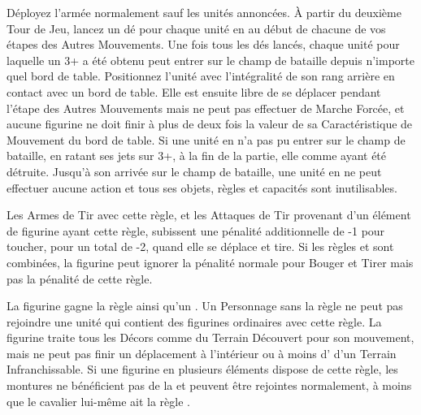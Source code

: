  Déployez l'armée normalement sauf les unités annoncées. À partir du deuxième Tour de Jeu, lancez un dé pour chaque unité en \ambush{} au début de chacune de vos étapes des Autres Mouvements. Une fois tous les dés lancés, chaque unité pour laquelle un 3+ a été obtenu peut entrer sur le champ de bataille depuis n'importe quel bord de table. Positionnez l'unité avec l'intégralité de son rang arrière en contact avec un bord de table. Elle est ensuite libre de se déplacer pendant l'étape des Autres Mouvements mais ne peut pas effectuer de Marche Forcée, et aucune figurine ne doit finir à plus de deux fois la valeur de sa Caractéristique de Mouvement du bord de table. Si une unité en \ambush{} n'a pas pu entrer sur le champ de bataille, en ratant ses jets sur 3+, à la fin de la partie, elle comme ayant été détruite.  Jusqu'à son arrivée sur le champ de bataille, une unité en \ambush{} ne peut effectuer aucune action et tous ses objets, règles et capacités sont inutilisables.


Les Armes de Tir avec cette règle, et les Attaques de Tir provenant d'un élément de figurine ayant cette règle, subissent une pénalité additionnelle de -1 pour toucher, pour un total de -2, quand elle se déplace et tire. Si les règles \unwieldy{} et \quicktofire{} sont combinées, la figurine peut ignorer la pénalité normale pour Bouger et Tirer mais pas la pénalité de cette règle.


La figurine gagne la règle \magicalattacks{} ainsi qu'un . Un Personnage sans la règle \ethereal{} ne peut pas rejoindre une unité qui contient des figurines ordinaires avec cette règle. La figurine traite tous les Décors comme du Terrain Découvert pour son mouvement, mais ne peut pas finir un déplacement à l'intérieur ou à moins d' d'un Terrain Infranchissable. Si une figurine en plusieurs éléments dispose de cette règle, les montures ne bénéficient pas de la \wardsave{} et peuvent être rejointes normalement, à moins que le cavalier lui-même ait la règle \ethereal{}.

